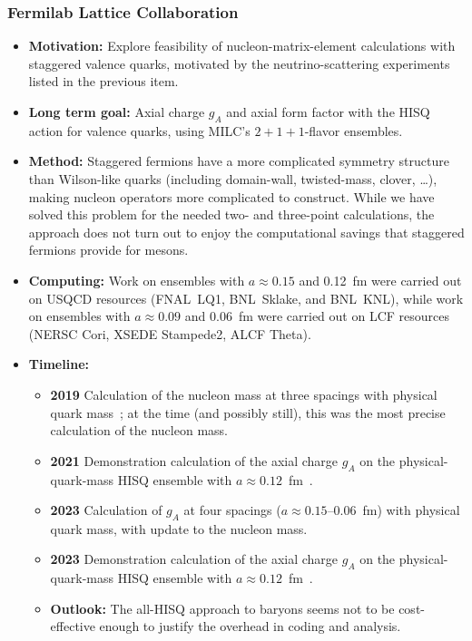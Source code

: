 \documentclass[12pt,hyperpdf]{article}
\begin{document}
\subsubsection{Fermilab Lattice Collaboration}
\begin{itemize}
   \item{\bf Motivation:} Explore feasibility of nucleon-matrix-element calculations with staggered valence quarks, motivated by the neutrino-scattering experiments listed in the previous item.
   \item{\bf Long term goal:} Axial charge $g_A$ and axial form factor with the HISQ action for valence quarks, using MILC's $2+1+1$-flavor ensembles.
   \item{\bf Method:} Staggered fermions have a more complicated symmetry structure than Wilson-like quarks (including domain-wall, twisted-mass, clover, \ldots), making nucleon operators more complicated to construct.  While we have solved this problem for the needed two- and three-point calculations, the approach does not turn out to enjoy the computational savings that staggered fermions provide for mesons.
    \item{\bf Computing:} Work on ensembles with $a\approx0.15$ and 0.12~fm were carried out on USQCD resources (FNAL~LQ1, BNL~Sklake, and BNL~KNL), while work on ensembles with $a\approx0.09$ and 0.06~fm were carried out on LCF resources (NERSC Cori, XSEDE Stampede2, ALCF Theta).
\item{\bf Timeline:}
\begin{itemize}
   \item{\bf 2019} Calculation of the nucleon mass at three spacings with physical quark mass~\cite{Lin:2019pia}; at the time (and possibly still), this was the most precise calculation of the nucleon mass.
   \item{\bf 2021} Demonstration calculation of the axial charge $g_A$ on the physical-quark-mass HISQ ensemble with $a\approx0.12$~fm~\cite{Lin:2020wko}.
   \item{\bf 2023} Calculation of $g_A$ at four spacings ($a\approx0.15$--0.06~fm) with physical quark mass, with update to the nucleon mass.
   \item{\bf 2023} Demonstration calculation of the axial charge $g_A$ on the physical-quark-mass HISQ ensemble with $a\approx0.12$~fm~\cite{Lin:2020wko}.
\item{\bf Outlook:} The all-HISQ approach to baryons seems not to be cost-effective enough to justify the overhead in coding and analysis.
\end{itemize}
\end{itemize}
\end{document}
